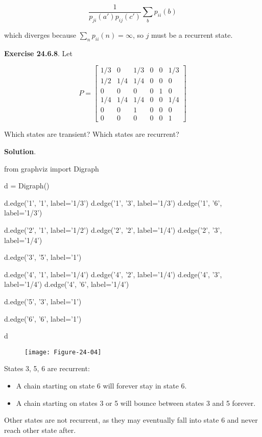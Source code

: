 \[\frac{1}{p_{ji}(a') p_{ij}(c')} \sum_b p_{ii}(b)\]

which diverges because \(\sum_{n} p_{ii}(n) = \infty\), so \(j\) must be a
recurrent state.

\textbf{Exercise 24.6.8}. Let

\[ P = \begin{bmatrix}
1/3 & 0   & 1/3 & 0 & 0 & 1/3 \\
1/2 & 1/4 & 1/4 & 0 & 0 & 0   \\
0   & 0   & 0   & 0 & 1 & 0   \\
1/4 & 1/4 & 1/4 & 0 & 0 & 1/4 \\
0   & 0   & 1   & 0 & 0 & 0   \\
0   & 0   & 0   & 0 & 0 & 1
\end{bmatrix}\]

Which states are transient? Which states are recurrent?

\textbf{Solution}.

\begin{python}
from graphviz import Digraph

d = Digraph()

d.edge('1', '1', label='1/3')
d.edge('1', '3', label='1/3')
d.edge('1', '6', label='1/3')

d.edge('2', '1', label='1/2')
d.edge('2', '2', label='1/4')
d.edge('2', '3', label='1/4')

d.edge('3', '5', label='1')

d.edge('4', '1', label='1/4')
d.edge('4', '2', label='1/4')
d.edge('4', '3', label='1/4')
d.edge('4', '6', label='1/4')

d.edge('5', '3', label='1')

d.edge('6', '6', label='1')

d
\end{python}
 
\begin{figure}[H]
\centering
\texttt{[image: Figure-24-04]}
\end{figure}

States 3, 5, 6 are recurrent:

\begin{itemize}[tightlist]
\item
  A chain starting on state 6 will forever stay in state 6.
\item
  A chain starting on states 3 or 5 will bounce between states 3 and 5
  forever.
\end{itemize}

Other states are not recurrent, as they may eventually fall into state 6
and never reach other state after.

